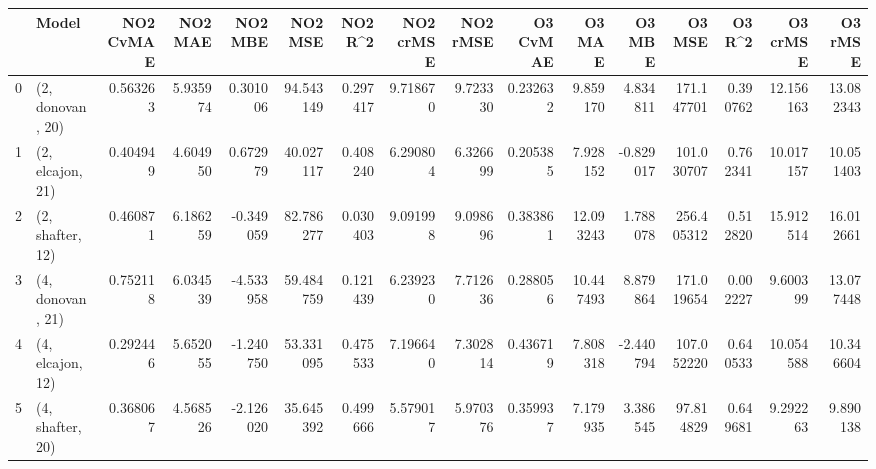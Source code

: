 \begin{tabular}{llrrrrrrrrrrrrrr}
\toprule
{} &             Model &  NO2 CvMAE &   NO2 MAE &   NO2 MBE &    NO2 MSE &   NO2 R\textasciicircum2 &  NO2 crMSE &  NO2 rMSE &  O3 CvMAE &     O3 MAE &    O3 MBE &      O3 MSE &    O3 R\textasciicircum2 &   O3 crMSE &    O3 rMSE \\
\midrule
0 &  (2, donovan, 20) &   0.563263 &  5.935974 &  0.301006 &  94.543149 &  0.297417 &   9.718670 &  9.723330 &  0.232632 &   9.859170 &  4.834811 &  171.147701 &  0.390762 &  12.156163 &  13.082343 \\
1 &  (2, elcajon, 21) &   0.404949 &  4.604950 &  0.672979 &  40.027117 &  0.408240 &   6.290804 &  6.326699 &  0.205385 &   7.928152 & -0.829017 &  101.030707 &  0.762341 &  10.017157 &  10.051403 \\
2 &  (2, shafter, 12) &   0.460871 &  6.186259 & -0.349059 &  82.786277 &  0.030403 &   9.091998 &  9.098696 &  0.383861 &  12.093243 &  1.788078 &  256.405312 &  0.512820 &  15.912514 &  16.012661 \\
3 &  (4, donovan, 21) &   0.752118 &  6.034539 & -4.533958 &  59.484759 &  0.121439 &   6.239230 &  7.712636 &  0.288056 &  10.447493 &  8.879864 &  171.019654 &  0.002227 &   9.600399 &  13.077448 \\
4 &  (4, elcajon, 12) &   0.292446 &  5.652055 & -1.240750 &  53.331095 &  0.475533 &   7.196640 &  7.302814 &  0.436719 &   7.808318 & -2.440794 &  107.052220 &  0.640533 &  10.054588 &  10.346604 \\
5 &  (4, shafter, 20) &   0.368067 &  4.568526 & -2.126020 &  35.645392 &  0.499666 &   5.579017 &  5.970376 &  0.359937 &   7.179935 &  3.386545 &   97.814829 &  0.649681 &   9.292263 &   9.890138 \\
\bottomrule
\end{tabular}
